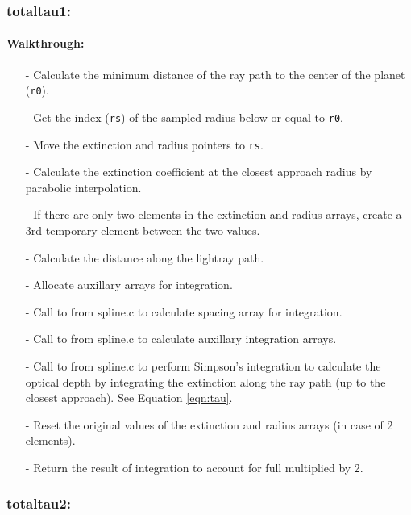 \documentclass[letterpaper,12pt]{article}
\begin{document}
\subsubsection{totaltau1:}
\paragraph{Walkthrough:}
\begin{enumerate}[leftmargin=10pt, noitemsep, parsep=0pt, topsep=0ex]
\item[-] Calculate the minimum distance of the ray path to the center
  of the planet ({\tt r0}).
\item[-] Get the index ({\tt rs}) of the sampled radius below or equal
  to {\tt r0}.
\item[-] Move the extinction and radius pointers to {\tt rs}.
\item[-] Calculate the extinction coefficient at the closest approach
  radius by parabolic interpolation.
\item[-] If there are only two elements in the extinction and radius
  arrays, create a 3rd temporary element between the two values.
\item[-] Calculate the distance along the lightray path.
\item[-] Allocate auxillary arrays for integration.
\item[-] Call to  from spline.c to calculate spacing array for integration.
\item[-] Call to  from spline.c to calculate auxillary integration arrays.
\item[-] Call to  from spline.c to perform Simpson's integration to calculate the optical depth by integrating the
  extinction along the ray path (up to the closest approach). See Equation \ref{eqn:tau}.
\item[-] Reset the original values of the extinction and radius arrays
  (in case of 2 elements).
\item[-] Return the result of integration to account for full
 multiplied by 2.
\end{enumerate}

\subsubsection{totaltau2:}
\end{document}
